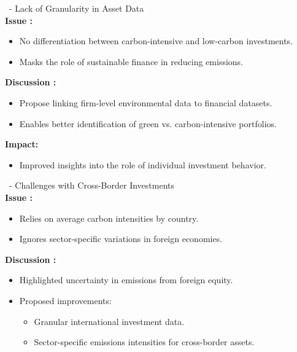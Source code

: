 \documentclass[10pt]{beamer}
\begin{document}
\begin{frame}{\subsecname \  - \subsubsecname}
    Lack of Granularity in Asset Data \\ 
    \textbf{Issue :}
    \begin{itemize}
        \item No differentiation between carbon-intensive and low-carbon investments.
        \item Masks the role of sustainable finance in reducing emissions.
    \end{itemize}
    \vspace{0.3cm}
    \textbf{Discussion :}
    \begin{itemize}
        \item Propose linking firm-level environmental data to financial datasets.
        \item Enables better identification of green vs. carbon-intensive portfolios.
    \end{itemize}
    \vspace{0.3cm}
    \textbf{Impact:}
    \begin{itemize}
        \item Improved insights into the role of individual investment behavior.
    \end{itemize}
\end{frame}

\begin{frame}{\subsecname \  - \subsubsecname}
    Challenges with Cross-Border Investments \\
    \textbf{Issue :}
    \begin{itemize}
        \item Relies on average carbon intensities by country.
        \item Ignores sector-specific variations in foreign economies.
    \end{itemize}
    \vspace{0.3cm}
    \textbf{Discussion :}
    \begin{itemize}
        \item Highlighted uncertainty in emissions from foreign equity.
        \item Proposed improvements:
        \begin{itemize}
            \item Granular international investment data.
            \item Sector-specific emissions intensities for cross-border assets.
        \end{itemize}
    \end{itemize}
\end{frame}
\end{document}
